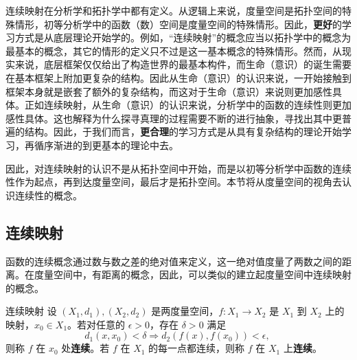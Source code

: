 
连续映射在分析学和拓扑学中都有定义。从逻辑上来说，度量空间是拓扑空间的特殊情形，初等分析学中的函数（数）空间是度量空间的特殊情形。因此，\textbf{更好}的学习方式是从底层理论开始学的。例如，“连续映射”的概念应当以拓扑学中的概念为最基本的概念，其它的情形的定义只不过是这一基本概念的特殊情形。然而，从现实来说，底层框架仅仅给出了构造世界的最基本构件，而生命（意识）的诞生需要在基本框架上附加更复杂的结构。因此从生命（意识）的认识来说，一开始接触到框架本身就是嵌套了额外的复杂结构，而这对于生命（意识）来说则更加感性具体。正如连续映射，从生命（意识）的认识来说，分析学中的函数的连续性则更加感性具体。这也解释为什么探寻真理的过程需要不断的进行抽象，寻找出其中更普遍的结构。因此，于我们而言，\textbf{更合理}的学习方式是从具有复杂结构的理论开始学习，再循序渐进的到更基本的理论中去。

因此，对连续映射的认识不是从拓扑空间中开始，而是以初等分析学中函数的连续性作为起点，再到达度量空间，最后才是拓扑空间。本节将从度量空间的视角去认识连续性的概念。

\subsection{连续映射}
函数的连续概念通过数与数之差的绝对值来定义，这一绝对值度量了两数之间的距离。在度量空间中，有距离的概念，因此，可以类似的建立起度量空间中连续映射的概念。
\begin{definition}{连续映射}
设 $(X_1,d_1),(X_2,d_2)$ 是两度量空间，$f:X_1\rightarrow X_2$ 是 $X_1$ 到 $X_2$ 上的映射，$x_0\in X_1$。若对任意的 $\epsilon>0$，存在 $\delta>0$ 满足
\begin{equation}
d_1(x,x_0)<\delta \Rightarrow d_2(f(x),f(x_0))<\epsilon,~
\end{equation}
则称 $f$ 在 $x_0$ 处\textbf{连续}。若 $f$ 在 $X_1$ 的每一点都连续，则称 $f$ 在 $X_1$ 上\textbf{连续}。
\end{definition}












